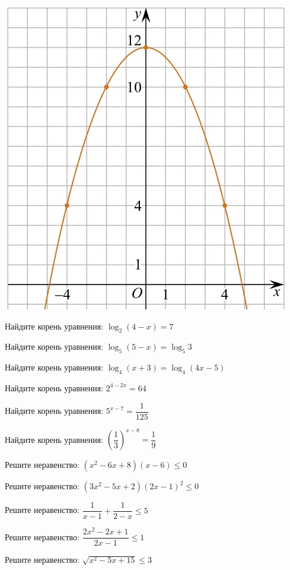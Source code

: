 \begin{homework}[number=1]
\begin{listofex}
\begin{minipage}[c]{0.12\textwidth}
			\includegraphics[align=t, width=\textwidth]{../../pics/KUZNETSOVM6H1-1.jpg}
		\end{minipage}
		\item Найдите корень уравнения: \( \log_2(4-x)=7 \)
		\item Найдите корень уравнения: \( \log_5(5-x)=\log_5{3} \)
		\item Найдите корень уравнения: \( \log_4(x+3)=\log_4(4x-5) \)
		\item Найдите корень уравнения: \( 2^{4-2x}=64 \)
		\item Найдите корень уравнения: \( 5^{x-7}=\dfrac{1}{125} \)
		\item Найдите корень уравнения: \( \left( \dfrac{1}{3} \right)^{x-8} = \dfrac{1}{9} \)
		\item Решите неравенство: \( (x^2-6x+8)(x-6) \le 0 \)
		\item Решите неравенство: \( (3x^2-5x+2)(2x-1)^2 \le 0 \)
		\item Решите неравенство: \( \dfrac{1}{x-1}+\dfrac{1}{2-x} \le 5 \)
		\item Решите неравенство: \( \dfrac{2x^2-2x+1}{2x-1} \le 1 \)
		\item Решите неравенство: \( \sqrt{x^2-5x+15} \le 3 \)
	\end{listofex}
\end{homework}

